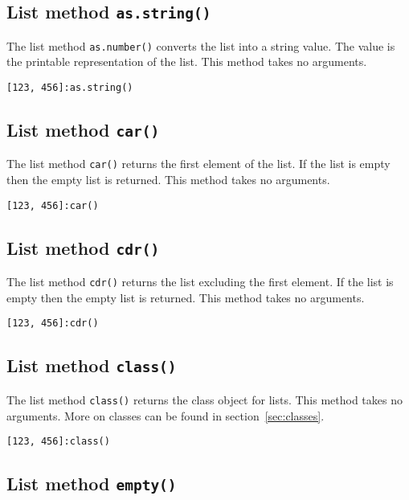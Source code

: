 \documentclass[11pt,a4paper]{scrbook}
\begin{document}
\subsection{List method \texttt{as.string()}}

The list method \texttt{as.number()} converts the list into a string value.
The value is the printable representation of the list. This method takes no
arguments.

\begin{lstlisting}[language=BibTool]
[123, 456]:as.string()
\end{lstlisting}

\subsection{List method \texttt{car()}}

The list method \texttt{car()} returns the first element of the list. If the
list is empty then the empty list is returned. This method takes no arguments.

\begin{lstlisting}[language=BibTool]
[123, 456]:car()
\end{lstlisting}

\subsection{List method \texttt{cdr()}}

The list method \texttt{cdr()} returns the list excluding the first element.
If the list is empty then the empty list is returned. This method takes no
arguments.

\begin{lstlisting}[language=BibTool]
[123, 456]:cdr()
\end{lstlisting}

\subsection{List method \texttt{class()}}

The list method \texttt{class()} returns the class object for lists. This
method takes no arguments. More on classes can be found in
section~\ref{sec:classes}.

\begin{lstlisting}[language=BibTool]
[123, 456]:class()
\end{lstlisting}

\subsection{List method \texttt{empty()}}
\end{document}

